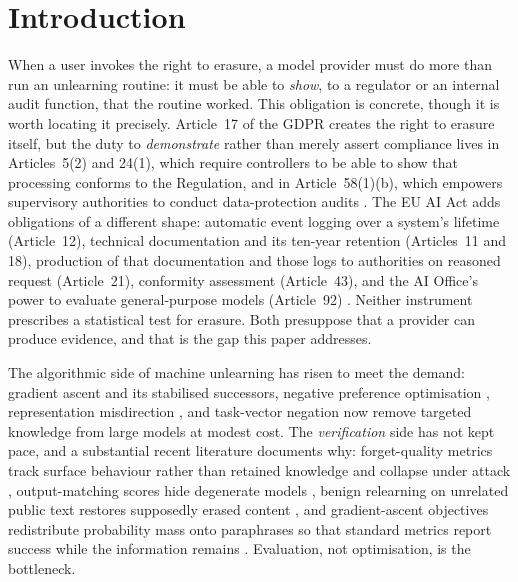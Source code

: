 \documentclass[pdflatex,sn-mathphys-num]{sn-jnl}
\theoremstyle{thmstyleone}
\theoremstyle{thmstyletwo}
\theoremstyle{thmstylethree}
\begin{document}
\maketitle

\section{Introduction}\label{sec:intro}

When a user invokes the right to erasure, a model provider must do more than run an
unlearning routine: it must be able to \emph{show}, to a regulator or an internal audit
function, that the routine worked. This obligation is concrete, though it is worth
locating it precisely. Article~17 of the GDPR creates the right to erasure itself, but
the duty to \emph{demonstrate} rather than merely assert compliance lives in
Articles~5(2) and 24(1), which require controllers to be able to show that processing
conforms to the Regulation, and in Article~58(1)(b), which empowers supervisory
authorities to conduct data-protection audits \citep{gdpr2016}. The EU AI Act adds
obligations of a different shape: automatic event logging over a system's lifetime
(Article~12), technical documentation and its ten-year retention (Articles~11 and 18),
production of that documentation and those logs to authorities on reasoned request
(Article~21), conformity assessment (Article~43), and the AI Office's power to evaluate
general-purpose models (Article~92) \citep{aiact2024}. Neither instrument prescribes a
statistical test for erasure. Both presuppose that a provider can produce evidence, and
that is the gap this paper addresses.

The algorithmic side of machine unlearning has risen to meet the demand: gradient ascent
and its stabilised successors, negative preference optimisation
\citep{zhang2024npo,fan2025simnpo}, representation misdirection \citep{li2024wmdp},
and task-vector negation now remove targeted knowledge from large models at modest
cost. The \emph{verification} side has not kept pace, and a substantial recent
literature documents why: forget-quality metrics track surface behaviour rather than
retained knowledge and collapse under attack \citep{wang2025towards}, output-matching
scores hide degenerate models \citep{yuan2025closer}, benign relearning on unrelated
public text restores supposedly erased content \citep{hu2025jogging}, and
gradient-ascent objectives redistribute probability mass onto paraphrases so that
standard metrics report success while the information remains
\citep{li2026beliefs,feng2025existing}. Evaluation, not optimisation, is the bottleneck.
\end{document}
